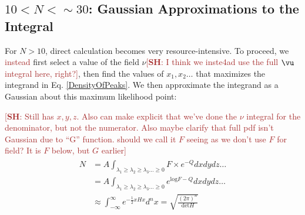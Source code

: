 \documentclass[12pt]{article}
\newcommand{\SH}[1]{\textcolor{brown}{[{\bf SH}: #1]}}
\newcommand{\sh}[1]{\textcolor{brown}{#1}}
\begin{document}

\subsection{$10 < N < \sim30$: Gaussian Approximations to the Integral}
For $N>10$, direct calculation becomes very resource-intensive. To proceed, we \sh{instead} first select a value of the field $\nu$\SH{I think we inste4ad use the full $\vu$ integral here, right?}, then find the values of $x_1, x_2 \ldots$ that maximizes the integrand in Eq. \ref{DensityOfPeaks}. We then approximate the integrand as a Gaussian about this maximum likelihood point:\

\SH{Still has $x,y,z$. Also can make explicit that we've done the $\nu$ integral for the denominator, but not the numerator. Also maybe clarify that full pdf isn't Gaussian due to ``G'' function. should we call it $F$ seeing as we don't use $F$ for field? It is $F$ below, but $G$ earlier}
\begin{align*}
\begin{split}
N &= A \int_{\lambda_1 \geq \lambda_2 \geq \lambda_3 \ldots \geq 0} F \times e^{-Q} dx dy dz \ldots \\
&=A\int_{\lambda_1 \geq \lambda_2 \geq \lambda_3 \ldots \geq 0} e^{\mathrm{log}F-Q} dx dy dz \ldots \\
&\approx \int_{-\infty}^{\infty} e^{-\frac{1}{2}xHx} d^nx = \sqrt{\frac{(2\pi)^n}{\mathrm{det} H}}
\end{split}
\end{align*}
\end{document}
